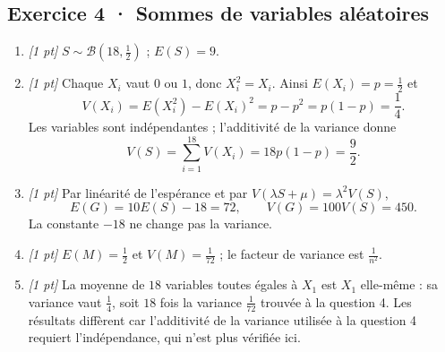 \subsection*{Exercice 4 · Sommes de variables aléatoires}\begin{enumerate}

\item \textit{[1 pt]} $S\sim\mathcal B(18,\frac{1}{2})$ ; $E(S)=9$.

\item \textit{[1 pt]} Chaque $X_i$ vaut $0$ ou $1$, donc $X_i^2=X_i$. Ainsi $E(X_i)=p=\frac{1}{2}$ et
\[V(X_i)=E(X_i^2)-E(X_i)^2=p-p^2=p(1-p)=\frac{1}{4}.\]
Les variables sont indépendantes ; l'additivité de la variance donne
\[V(S)=\sum_{i=1}^{18}V(X_i)=18p(1-p)=\frac{9}{2}.\]

\item \textit{[1 pt]} Par linéarité de l'espérance et par $V(\lambda S+\mu)=\lambda^2V(S)$,
\[E(G)=10E(S)-18=72,\qquad V(G)=100V(S)=450.\]
La constante $-18$ ne change pas la variance.

\item \textit{[1 pt]} $E(M)=\frac{1}{2}$ et $V(M)=\frac{1}{72}$ ; le facteur de variance est $\frac{1}{n^2}$.

\item \textit{[1 pt]} La moyenne de $18$ variables toutes égales à $X_1$ est $X_1$ elle-même : sa variance vaut $\frac{1}{4}$, soit $18$ fois la variance $\frac{1}{72}$ trouvée à la question 4. Les résultats diffèrent car l'additivité de la variance utilisée à la question 4 requiert l'indépendance, qui n'est plus vérifiée ici.

\end{enumerate}

\fi

\fi

